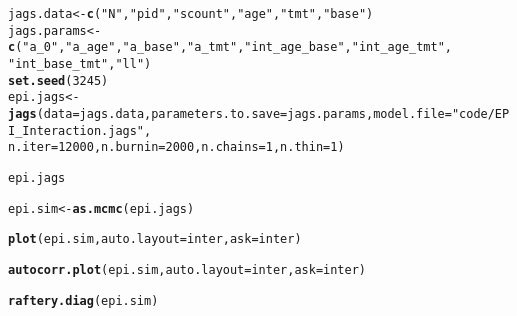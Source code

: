 \documentclass[12pt,letterpaper,oneside]{article}\usepackage{graphicx, color}
\makeatletter
\newcommand{\hlfunctioncall}[1]{\textcolor[rgb]{0.501960784313725,0,0.329411764705882}{\textbf{#1}}}%
\newcommand{\hlstring}[1]{\textcolor[rgb]{0.6,0.6,1}{#1}}%
\newenvironment{kframe}{%
 \def\at@end@of@kframe{}%
 \ifinner\ifhmode%
  \def\at@end@of@kframe{\end{minipage}}%
  \begin{minipage}{\columnwidth}%
 \fi\fi%
 \def\FrameCommand##1{\hskip\@totalleftmargin \hskip-\fboxsep
 \colorbox{shadecolor}{##1}\hskip-\fboxsep
     \hskip-\linewidth \hskip-\@totalleftmargin \hskip\columnwidth}%
 \MakeFramed {\advance\hsize-\width
   \@totalleftmargin\z@ \linewidth\hsize
   \@setminipage}}%
 {\par\unskip\endMakeFramed%
 \at@end@of@kframe}
\newenvironment{knitrout}{}{} %
\makeatother
\begin{document}
\begin{knitrout}\scriptsize
{}\color{fgcolor}\begin{kframe}
\begin{alltt}
jags.data <- \hlfunctioncall{c}(\hlstring{"N"}, \hlstring{"pid"}, \hlstring{"scount"}, \hlstring{"age"}, \hlstring{"tmt"}, \hlstring{"base"})
jags.params <- \hlfunctioncall{c}(\hlstring{"a_0"}, \hlstring{"a_age"}, \hlstring{"a_base"}, \hlstring{"a_tmt"}, \hlstring{"int_age_base"}, \hlstring{"int_age_tmt"}, 
    \hlstring{"int_base_tmt"}, \hlstring{"ll"})
\hlfunctioncall{set.seed}(3245)
epi.jags <- \hlfunctioncall{jags}(data = jags.data, parameters.to.save = jags.params, model.file = \hlstring{"code/EPI_Interaction.jags"}, 
    n.iter = 12000, n.burnin = 2000, n.chains = 1, n.thin = 1)
\end{alltt}


{\ttfamily\noindent\bfseries\color{errorcolor}{\#\# Error: \\\#\# Error parsing model file:\\\#\# syntax error on line 6 near """}}\begin{alltt}
epi.jags
\end{alltt}


{\ttfamily\noindent\bfseries\color{errorcolor}{\#\# Error: object 'epi.jags' not found}}\end{kframe}
\end{knitrout}

\begin{knitrout}\scriptsize
{}\color{fgcolor}\begin{kframe}
\begin{alltt}
epi.sim <- \hlfunctioncall{as.mcmc}(epi.jags)
\end{alltt}


{\ttfamily\noindent\bfseries\color{errorcolor}{\#\# Error: object 'epi.jags' not found}}\begin{alltt}
\hlfunctioncall{plot}(epi.sim, auto.layout = inter, ask = inter)
\end{alltt}


{\ttfamily\noindent\bfseries\color{errorcolor}{\#\# Error: object 'epi.sim' not found}}\begin{alltt}
\hlfunctioncall{autocorr.plot}(epi.sim, auto.layout = inter, ask = inter)
\end{alltt}


{\ttfamily\noindent\bfseries\color{errorcolor}{\#\# Error: object 'inter' not found}}\begin{alltt}
\hlfunctioncall{raftery.diag}(epi.sim)
\end{alltt}


{\ttfamily\noindent\bfseries\color{errorcolor}{\#\# Error: object 'epi.sim' not found}}\end{kframe}
\end{knitrout}
\end{document}

